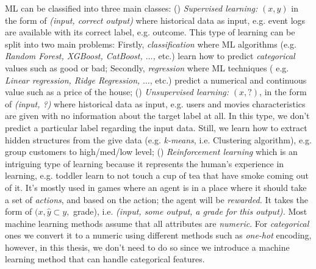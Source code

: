 ML can be classified into three main classes: () \textit{Supervised learning:} $(x,y)$ in the form of \textit{(input, correct output)} where historical data as input, e.g. event logs are available with its correct label, e.g. outcome. This type of learning can be split into two main problems: Firstly, \textit{classification} where ML algorithms (e.g. \textit{Random Forest, XGBoost, CatBoost, $\dots$,} etc.) learn how to predict \textit{categorical} values such as good or bad; Secondly, \textit{regression} where ML techniques ( e.g. \textit{Linear regression, Ridge Regression,} $\dots$, etc.) predict a numerical and continuous value such as a price of the house; () \textit{Unsupervised learning:} $(x, ?)$, in the form of \textit{(input, ?)} where historical data as input, e.g. users and movies characteristics are given with no information about the target label at all. In this type, we don’t predict a particular label regarding the input data. Still, we learn how to extract hidden structures from the give data (e.g. \textit{k-means}, i.e. Clustering algorithm), e.g. group customers to high/med/low level; () \textit{Reinforcement learning} which is an intriguing type of learning because  it represents the human's  experience in learning, e.g. toddler learn to not touch a cup of tea that have smoke coming out of it. It's mostly used in games where an agent is in a place where it should take a set of \textit{actions}, and based on the action; the agent will be \textit{rewarded.} It takes the form of $(x, \hat{y} \subset  y,$ grade), i.e. \textit{(input, some output, a grade for this output).} Most machine learning methods assume that all attributes are \textit{numeric}. For \textit{categorical} ones we convert it to a numeric using different methods such as \textit{one-hot} encoding, however, in this thesis, we don’t need to do so since we introduce a machine learning method that can handle categorical features. 



